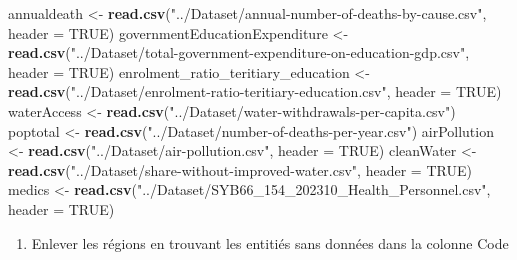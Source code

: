 \documentclass[
]{article}
\newenvironment{Shaded}{\begin{snugshade}}{\end{snugshade}}
\newcommand{\AttributeTok}[1]{\textcolor[rgb]{0.13,0.29,0.53}{#1}}
\newcommand{\ConstantTok}[1]{\textcolor[rgb]{0.56,0.35,0.01}{#1}}
\newcommand{\FunctionTok}[1]{\textcolor[rgb]{0.13,0.29,0.53}{\textbf{#1}}}
\newcommand{\NormalTok}[1]{#1}
\newcommand{\OtherTok}[1]{\textcolor[rgb]{0.56,0.35,0.01}{#1}}
\newcommand{\StringTok}[1]{\textcolor[rgb]{0.31,0.60,0.02}{#1}}
\providecommand{\tightlist}{%
  \setlength{\itemsep}{0pt}\setlength{\parskip}{0pt}}
\begin{document}
\begin{Shaded}
\begin{Highlighting}[]
\NormalTok{annualdeath }\OtherTok{\textless{}{-}} \FunctionTok{read.csv}\NormalTok{(}\StringTok{"../Dataset/annual{-}number{-}of{-}deaths{-}by{-}cause.csv"}\NormalTok{, }\AttributeTok{header =} \ConstantTok{TRUE}\NormalTok{)}
\NormalTok{governmentEducationExpenditure  }\OtherTok{\textless{}{-}} \FunctionTok{read.csv}\NormalTok{(}\StringTok{"../Dataset/total{-}government{-}expenditure{-}on{-}education{-}gdp.csv"}\NormalTok{, }\AttributeTok{header =} \ConstantTok{TRUE}\NormalTok{)}
\NormalTok{enrolment\_ratio\_teritiary\_education }\OtherTok{\textless{}{-}} \FunctionTok{read.csv}\NormalTok{(}\StringTok{"../Dataset/enrolment{-}ratio{-}teritiary{-}education.csv"}\NormalTok{, }\AttributeTok{header =} \ConstantTok{TRUE}\NormalTok{)}
\NormalTok{waterAccess }\OtherTok{\textless{}{-}} \FunctionTok{read.csv}\NormalTok{(}\StringTok{"../Dataset/water{-}withdrawals{-}per{-}capita.csv"}\NormalTok{)}
\NormalTok{poptotal }\OtherTok{\textless{}{-}} \FunctionTok{read.csv}\NormalTok{(}\StringTok{"../Dataset/number{-}of{-}deaths{-}per{-}year.csv"}\NormalTok{)}
\NormalTok{airPollution }\OtherTok{\textless{}{-}} \FunctionTok{read.csv}\NormalTok{(}\StringTok{"../Dataset/air{-}pollution.csv"}\NormalTok{, }\AttributeTok{header =} \ConstantTok{TRUE}\NormalTok{)}
\NormalTok{cleanWater }\OtherTok{\textless{}{-}} \FunctionTok{read.csv}\NormalTok{(}\StringTok{"../Dataset/share{-}without{-}improved{-}water.csv"}\NormalTok{, }\AttributeTok{header =} \ConstantTok{TRUE}\NormalTok{)}
\NormalTok{medics }\OtherTok{\textless{}{-}} \FunctionTok{read.csv}\NormalTok{(}\StringTok{"../Dataset/SYB66\_154\_202310\_Health\_Personnel.csv"}\NormalTok{, }\AttributeTok{header =} \ConstantTok{TRUE}\NormalTok{)}
\end{Highlighting}
\end{Shaded}

\begin{enumerate}
\def\labelenumi{\alph{enumi})}
\setcounter{enumi}{1}
\tightlist
\item
  Enlever les régions en trouvant les entitiés sans données dans la
  colonne Code
\end{enumerate}
\end{document}
